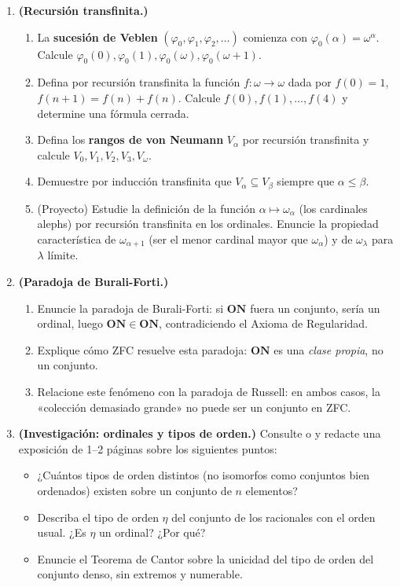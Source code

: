 \begin{enumerate}[leftmargin=2.5em, label=\textbf{\arabic*.}]
  \item \textbf{(Recursión transfinita.)}
  \begin{enumerate}[label=(\alph*)]
    \item La \textbf{sucesión de Veblen} $(\varphi_0, \varphi_1, \varphi_2, \ldots)$ comienza con $\varphi_0(\alpha) = \omega^\alpha$. Calcule $\varphi_0(0), \varphi_0(1), \varphi_0(\omega), \varphi_0(\omega+1)$.
    \item Defina por recursión transfinita la función $f: \omega \to \omega$ dada por $f(0) = 1$, $f(n+1) = f(n) + f(n)$. Calcule $f(0), f(1), \ldots, f(4)$ y determine una fórmula cerrada.
    \item Defina los \textbf{rangos de von Neumann} $V_\alpha$ por recursión transfinita y calcule $V_0, V_1, V_2, V_3, V_\omega$.
    \item Demuestre por inducción transfinita que $V_\alpha \subseteq V_\beta$ siempre que $\alpha \leq \beta$.
    \item (Proyecto) Estudie la definición de la función $\alpha \mapsto \omega_\alpha$ (los cardinales alephs) por recursión transfinita en los ordinales. Enuncie la propiedad característica de $\omega_{\alpha+1}$ (ser el menor cardinal mayor que $\omega_\alpha$) y de $\omega_\lambda$ para $\lambda$ límite.
  \end{enumerate}

  \item \textbf{(Paradoja de Burali-Forti.)}
  \begin{enumerate}[label=(\alph*)]
    \item Enuncie la paradoja de Burali-Forti: si $\mathbf{ON}$ fuera un conjunto, sería un ordinal, luego $\mathbf{ON} \in \mathbf{ON}$, contradiciendo el Axioma de Regularidad.
    \item Explique cómo ZFC resuelve esta paradoja: $\mathbf{ON}$ es una \emph{clase propia}, no un conjunto.
    \item Relacione este fenómeno con la paradoja de Russell: en ambos casos, la «colección demasiado grande» no puede ser un conjunto en ZFC.
  \end{enumerate}

  \item \textbf{(Investigación: ordinales y tipos de orden.)}
  Consulte \cite{sierpinski1958} o \cite{rosenstein1982} y redacte una exposición de 1--2 páginas sobre los siguientes puntos:
  \begin{itemize}[leftmargin=2em]
    \item ¿Cuántos tipos de orden distintos (no isomorfos como conjuntos bien ordenados) existen sobre un conjunto de $n$ elementos?
    \item Describa el tipo de orden $\eta$ del conjunto de los racionales con el orden usual. ¿Es $\eta$ un ordinal? ¿Por qué?
    \item Enuncie el Teorema de Cantor sobre la unicidad del tipo de orden del conjunto denso, sin extremos y numerable.
  \end{itemize}

\end{enumerate}

